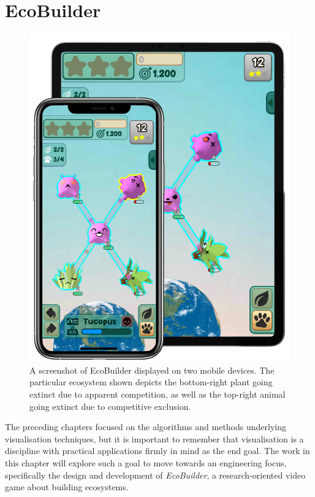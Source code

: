 \chapter{EcoBuilder}
\label{chap:joy}

\begin{figure}
    \centering
    \includegraphics[width=\textwidth]{joy/device.png}
    \caption[A screenshot of EcoBuilder displayed on mobile devices.]{A screenshot of EcoBuilder displayed on two mobile devices. The particular ecosystem shown depicts the bottom-right plant going extinct due to apparent competition, as well as the top-right animal going extinct due to competitive exclusion.}
    \label{fig:my_label}
\end{figure}

The preceding chapters focused on the algorithms and methods underlying visualisation techniques, but it is important to remember that visualisation is a discipline with practical applications firmly in mind as the end goal.
The work in this chapter will explore such a goal to move towards an engineering focus, specifically the design and development of \emph{EcoBuilder}, a research-oriented video game about building ecosystems.

